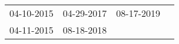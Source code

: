 \begin{supertabular}{llll}
 04-10-2015 &  04-29-2017 &  08-17-2019 \\
 04-11-2015 &  08-18-2018 &             \\
\end{supertabular}

